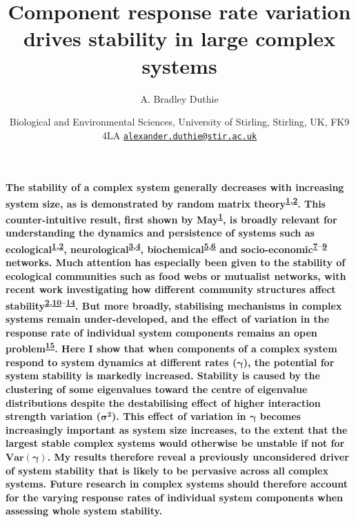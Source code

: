\documentclass[]{article}
\title{Component response rate variation drives stability in large complex
systems}
\author{A. Bradley Duthie}
\date{Biological and Environmental Sciences, University of Stirling, Stirling,
UK, FK9 4LA
\href{mailto:alexander.duthie@stir.ac.uk}{\nolinkurl{alexander.duthie@stir.ac.uk}}}
\begin{document}
\maketitle

\textbf{The stability of a complex system generally decreases with
increasing system size, as is demonstrated by random matrix
theory\textsuperscript{\protect\hyperlink{ref-May1972}{1},\protect\hyperlink{ref-Allesina2012}{2}}.
This counter-intuitive result, first shown by
May\textsuperscript{\protect\hyperlink{ref-May1972}{1}}, is broadly
relevant for understanding the dynamics and persistence of systems such
as
ecological\textsuperscript{\protect\hyperlink{ref-May1972}{1},\protect\hyperlink{ref-Allesina2012}{2}},
neurological\textsuperscript{\protect\hyperlink{ref-Gray2008}{3},\protect\hyperlink{ref-Gray2009}{4}},
biochemical\textsuperscript{\protect\hyperlink{ref-Rosenfeld2009}{5},\protect\hyperlink{ref-MacArthur2010}{6}}
and
socio-economic\textsuperscript{\protect\hyperlink{ref-Haldane2011}{7}--\protect\hyperlink{ref-Bardoscia2017}{9}}
networks. Much attention has especially been given to the stability of
ecological communities such as food webs or mutualist networks, with
recent work investigating how different community structures affect
stability\textsuperscript{\protect\hyperlink{ref-Allesina2012}{2},\protect\hyperlink{ref-Mougi2012}{10}--\protect\hyperlink{ref-Patel2018}{14}}.
But more broadly, stabilising mechanisms in complex systems remain
under-developed, and the effect of variation in the response rate of
individual system components remains an open
problem\textsuperscript{\protect\hyperlink{ref-Allesina2015}{15}}. Here
I show that when components of a complex system respond to system
dynamics at different rates (\(\boldsymbol{\gamma}\)), the potential for
system stability is markedly increased. Stability is caused by the
clustering of some eigenvalues toward the centre of eigenvalue
distributions despite the destabilising effect of higher interaction
strength variation (\(\boldsymbol{\sigma^{2}}\)). This effect of
variation in \(\boldsymbol{\gamma}\) becomes increasingly important as
system size increases, to the extent that the largest stable complex
systems would otherwise be unstable if not for
\(\boldsymbol{Var(\gamma)}\). My results therefore reveal a previously
unconsidered driver of system stability that is likely to be pervasive
across all complex systems. Future research in complex systems should
therefore account for the varying response rates of individual system
components when assessing whole system stability.}
\end{document}
